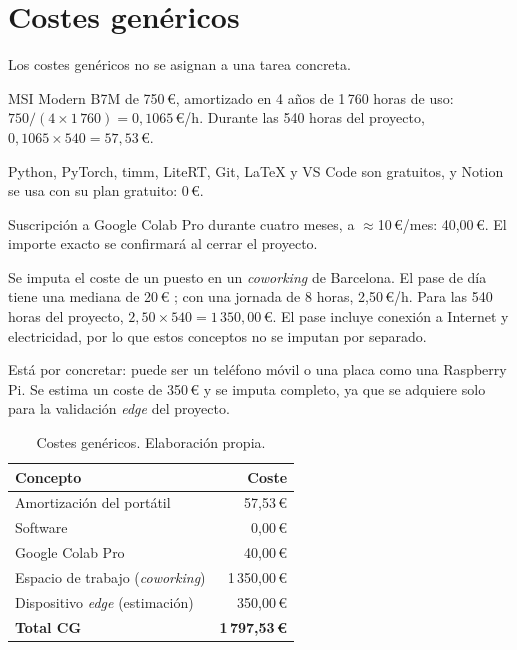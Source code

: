 \section{Costes genéricos}
\label{sec:cg}

Los costes genéricos no se asignan a una tarea concreta.

\begin{description}[leftmargin=0.45cm,labelindent=0cm,style=nextline,
  itemsep=0.2\baselineskip]
  \item[Amortización del portátil (R3).] MSI Modern B7M de 750\,€,
  amortizado en 4 años de 1\,760 horas de uso:
  $750 / (4 \times 1\,760) = 0{,}1065$\,€/h. Durante las 540 horas del
  proyecto, $0{,}1065 \times 540 = 57{,}53$\,€.
  \item[Software (R5, R6).] Python, PyTorch, timm, LiteRT, Git, LaTeX y
  VS Code son gratuitos, y Notion se usa con su plan gratuito: 0\,€.
  \item[Cómputo externo (R4).] Suscripción a Google Colab Pro durante cuatro
  meses, a $\approx$10\,€/mes: 40,00\,€. El importe exacto se confirmará al cerrar el proyecto.
  \item[Espacio de trabajo.] Se imputa el coste de un puesto en un
  \emph{coworking} de Barcelona. El pase de día tiene una mediana de 20\,€
  \citep{OnecoworkingcomCitiesBarcelona}; con una jornada de 8 horas, 2,50\,€/h.
  Para las 540 horas del proyecto, $2{,}50 \times 540 = 1\,350{,}00$\,€. El
  pase incluye conexión a Internet y electricidad, por lo que estos conceptos
  no se imputan por separado.
  \item[Dispositivo \emph{edge} (R5).] Está por concretar: puede ser un teléfono
  móvil o una placa como una Raspberry Pi. Se estima un coste de 350\,€ y se imputa
  completo, ya que se adquiere solo para la validación \emph{edge} del proyecto.
\end{description}

\begin{table}[H]
  \centering
  \small
  \begin{tabular}{lr}
    \toprule
    \textbf{Concepto} & \textbf{Coste} \\
    \midrule
    Amortización del portátil & 57,53\,€ \\
    Software & 0,00\,€ \\
    Google Colab Pro & 40,00\,€ \\
    Espacio de trabajo (\emph{coworking}) & 1\,350,00\,€ \\
    Dispositivo \emph{edge} (estimación) & 350,00\,€ \\
    \midrule
    \textbf{Total CG} & \textbf{1\,797,53\,€} \\
    \bottomrule
  \end{tabular}
  \caption[Costes genéricos]{Costes genéricos. Elaboración propia.}
  \label{tab:cg}
\end{table}

